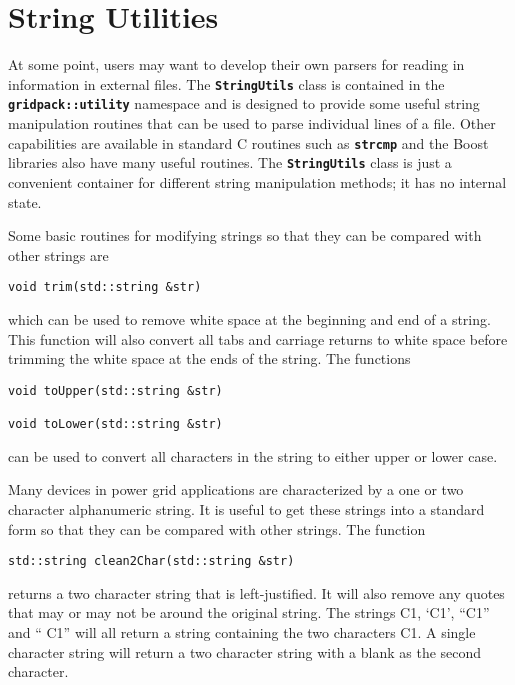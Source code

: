 \section{String Utilities}\label{string_utils}

At some point, users may want to develop their own parsers for reading in information in external files. The \texttt{\textbf{StringUtils}} class is contained in the \texttt{\textbf{gridpack::utility}} namespace and is designed to provide some useful string manipulation routines that can be used to parse individual lines of a file. Other capabilities are available in standard C routines such as \texttt{\textbf{strcmp}} and the Boost libraries also have many useful routines. The \texttt{\textbf{StringUtils}} class is just a convenient container for different string manipulation methods; it has no internal state.

Some basic routines for modifying strings so that they can be compared with other strings are

{
\color{red}
\begin{Verbatim}[fontseries=b]
void trim(std::string &str)
\end{Verbatim}
}

which can be used to remove white space at the beginning and end of a string. This function will also convert all tabs and carriage returns to white space before trimming the white space at the ends of the string. The functions

{
\color{red}
\begin{Verbatim}[fontseries=b]
void toUpper(std::string &str)

void toLower(std::string &str)
\end{Verbatim}
}

can be used to convert all characters in the string to either upper or lower case.

Many devices in power grid applications are characterized by a one or two character alphanumeric string. It is useful to get these strings into a standard form so that they can be compared with other strings. The function

{
\color{red}
\begin{Verbatim}[fontseries=b]
std::string clean2Char(std::string &str)
\end{Verbatim}
}

returns a two character string that is left-justified. It will also remove any
quotes that may or may not be around the original string. The strings C1, `C1',
``C1'' and ``  C1'' will all return a string containing the two characters C1. A
single character string will return a two character string with a blank as the
second character.

